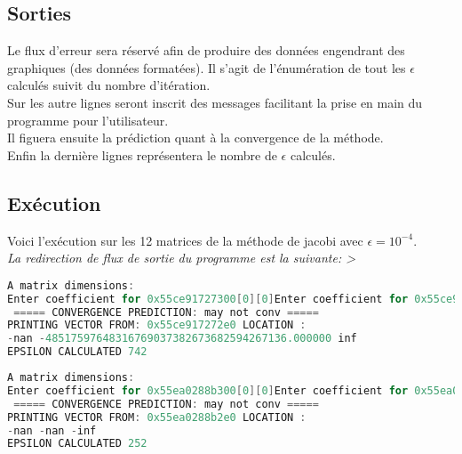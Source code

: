 \subsection{Sorties}
Le flux d'erreur sera réservé afin de produire des données engendrant des graphiques (des données formatées). Il s'agit de l'énumération de tout les $\epsilon$ calculés suivit du nombre d'itération. \\
Sur les autre lignes seront inscrit des messages facilitant la prise en main du programme pour l'utilisateur. \\
Il figuera ensuite la prédiction quant à la convergence de la méthode.\\
Enfin la dernière lignes représentera le nombre de $\epsilon$ calculés. \\
\subsection{Exécution}
Voici l'exécution sur les 12 matrices de la méthode de jacobi avec $\epsilon=10^{-4}$.\\
\textit{La redirection de flux de sortie du programme est la suivante: >}
\begin{lstlisting}[language=C,inputencoding=utf8, basicstyle=\fontsize{8}{10}\selectfont,caption=Execution with A1 matrix]
A matrix dimensions: 
Enter coefficient for 0x55ce91727300[0][0]Enter coefficient for 0x55ce91727300[0][1]Enter coefficient for 0x55ce91727300[0][2]Enter coefficient for 0x55ce91727300[1][0]Enter coefficient for 0x55ce91727300[1][1]Enter coefficient for 0x55ce91727300[1][2]Enter coefficient for 0x55ce91727300[2][0]Enter coefficient for 0x55ce91727300[2][1]Enter coefficient for 0x55ce91727300[2][2]
 ===== CONVERGENCE PREDICTION: may not conv =====
PRINTING VECTOR FROM: 0x55ce917272e0 LOCATION :
-nan -48517597648316769037382673682594267136.000000 inf
EPSILON CALCULATED 742
\end{lstlisting}
\begin{lstlisting}[language=C,inputencoding=utf8, basicstyle=\fontsize{8}{10}\selectfont,caption=Execution with A2 matrix]
A matrix dimensions: 
Enter coefficient for 0x55ea0288b300[0][0]Enter coefficient for 0x55ea0288b300[0][1]Enter coefficient for 0x55ea0288b300[0][2]Enter coefficient for 0x55ea0288b300[1][0]Enter coefficient for 0x55ea0288b300[1][1]Enter coefficient for 0x55ea0288b300[1][2]Enter coefficient for 0x55ea0288b300[2][0]Enter coefficient for 0x55ea0288b300[2][1]Enter coefficient for 0x55ea0288b300[2][2]
 ===== CONVERGENCE PREDICTION: may not conv =====
PRINTING VECTOR FROM: 0x55ea0288b2e0 LOCATION :
-nan -nan -inf
EPSILON CALCULATED 252
\end{lstlisting}
